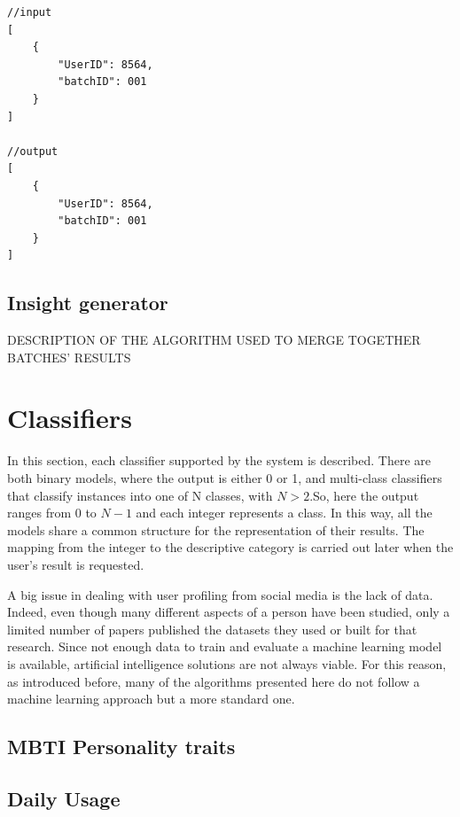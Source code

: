\begin{multicols}{2}
\begin{verbatim}
//input
[
    {
        "UserID": 8564,
        "batchID": 001
    }
]
            
//output
[
    {
        "UserID": 8564,
        "batchID": 001
    }
]
\end{verbatim}
\end{multicols}

\subsection{Insight generator}
\label{sec:Generator}
DESCRIPTION OF THE ALGORITHM USED TO MERGE TOGETHER BATCHES' RESULTS

\section{Classifiers}
\label{sec:Classifiers}

In this section, each classifier supported by the system is described. There are both binary models, where the output is either 0 or 1, and multi-class classifiers that classify instances into one of N classes, with $N>2$.So, here the output ranges from 0 to $N-1$ and each integer represents a class.
In this way, all the models share a common structure for the representation of their results. The mapping from the integer to the descriptive category is carried out later when the user's result is requested.

A big issue in dealing with user profiling from social media is the lack of data. Indeed, even though many different aspects of a person have been studied, only a limited number of papers published the datasets they used or built for that research.
Since not enough data to train and evaluate a machine learning model is available, artificial intelligence solutions are not always viable.
For this reason, as introduced before, many of the algorithms presented here do not follow a machine learning approach but a more standard one.

\subsection{MBTI Personality traits}

\subsection{Daily Usage}

